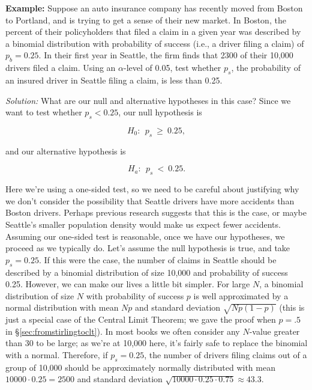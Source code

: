 \textbf{Example:} \ex Suppose an auto insurance company has recently moved from Boston to Portland, and is trying to get a sense of their new market.  In Boston, the percent of their policyholders that filed a claim in a given year was described by a binomial distribution with probability of success (i.e., a driver filing a claim) of $p_b=0.25$.  In their first year in Seattle, the firm finds that 2300 of their 10,000 drivers filed a claim.  Using an $\alpha$-level of 0.05, test whether $p_s$, the probability of an insured driver in Seattle filing a claim, is less than 0.25.



\emph{Solution:} What are our null and alternative hypotheses in this case?  Since we want to test whether $p_s<0.25$, our null hypothesis is

\begin{equation*}

H_0:\ \  p_s\ \geq\ 0.25,

\end{equation*}

and our alternative hypothesis is

\begin{equation*}

H_a:\ \ p_s\ <\ 0.25.

\end{equation*}



Here we're using a one-sided test, so we need to be careful about justifying why we don't consider the possibility that Seattle drivers have more accidents than Boston drivers.  Perhaps previous research suggests that this is the case, or maybe Seattle's smaller population density would make us expect fewer accidents.  Assuming our one-sided test is reasonable, once we have our hypotheses, we proceed as we typically do.  Let's assume the null hypothesis is true, and take $p_s = 0.25$.  If this were the case, the number of claims in Seattle should be described by a binomial distribution of size 10,000 and probability of success 0.25.  However, we can make our lives a little bit simpler.  For large $N$, a binomial distribution of size $N$ with probability of success $p$ is well approximated by a normal distribution with mean $Np$ and standard deviation $\sqrt{Np(1-p)}$ (this is just a special case of the Central Limit Theorem; we gave the proof when $p = .5$ in \S\ref{sec:fromstirlingtoclt}). In most books we often consider any $N$-value greater than 30 to be large; as we're at 10,000 here, it's fairly safe to replace the binomial with a normal. Therefore, if $p_s = 0.25$, the number of drivers filing claims out of a group of 10,000 should be approximately normally distributed with mean $10000 \cdot 0.25 = 2500$ and standard deviation $\sqrt{10000 \cdot 0.25 \cdot 0.75} \approx 43.3$.



